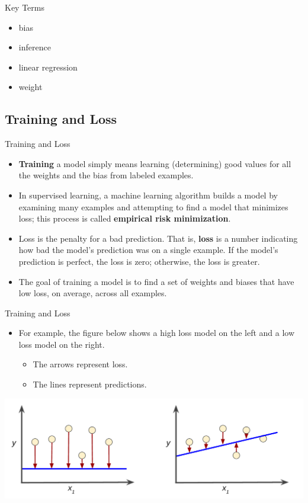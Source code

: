 \documentclass{beamer}
\begin{document}
\begin{frame}{Key Terms}
\begin{itemize}
    \item bias
    \item inference
    \item linear regression
    \item weight
\end{itemize}
\end{frame}


\subsection{Training and Loss}

\begin{frame}{Training and Loss}
\begin{itemize}
    \item {\bf Training} a model simply means learning (determining) good values for all the weights and the bias from labeled examples. 
    
    \item In supervised learning, a machine learning algorithm builds a model by examining many examples and attempting to find a model that minimizes loss; this process is called {\bf empirical risk minimization}.
    
    \item Loss is the penalty for a bad prediction. That is, {\bf loss} is a number indicating how bad the model's prediction was on a single example. If the model's prediction is perfect, the loss is zero; otherwise, the loss is greater. 
    
    \item The goal of training a model is to find a set of weights and biases that have low loss, on average, across all examples.
\end{itemize}
\end{frame}

\begin{frame}{Training and Loss}
\begin{itemize}
    \item For example, the figure below shows a high loss model on the left and a low loss model on the right. 
    \begin{itemize}
        \item The arrows represent loss.
        \item The lines represent predictions.
    \end{itemize}
\end{itemize}
\includegraphics[width=\textwidth]{images/LossSideBySide.png}
\end{frame}
\end{document}
